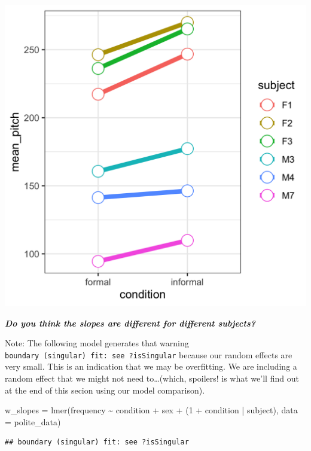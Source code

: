 \documentclass[
  openany]{book}
\newenvironment{Shaded}{\begin{snugshade}}{\end{snugshade}}
\newcommand{\AttributeTok}[1]{\textcolor[rgb]{0.77,0.63,0.00}{#1}}
\newcommand{\DecValTok}[1]{\textcolor[rgb]{0.00,0.00,0.81}{#1}}
\newcommand{\FunctionTok}[1]{\textcolor[rgb]{0.00,0.00,0.00}{#1}}
\newcommand{\NormalTok}[1]{#1}
\newcommand{\OtherTok}[1]{\textcolor[rgb]{0.56,0.35,0.01}{#1}}
\newcommand{\SpecialCharTok}[1]{\textcolor[rgb]{0.00,0.00,0.00}{#1}}
\begin{document}
\includegraphics[width=16.67in]{images/m3/subject_slopes}

\textbf{\emph{Do you think the slopes are different for different subjects?}}

Note: The following model generates that warning \texttt{boundary\ (singular)\ fit:\ see\ ?isSingular} because our random effects are very small. This is an indication that we may be overfitting. We are including a random effect that we might not need to\ldots(which, spoilers! is what we'll find out at the end of this secion using our model comparison).

\begin{Shaded}
\begin{Highlighting}[]
\NormalTok{w\_slopes }\OtherTok{=} \FunctionTok{lmer}\NormalTok{(frequency }\SpecialCharTok{\textasciitilde{}}\NormalTok{ condition }\SpecialCharTok{+}\NormalTok{ sex }\SpecialCharTok{+}\NormalTok{ (}\DecValTok{1} \SpecialCharTok{+}\NormalTok{ condition }\SpecialCharTok{|}\NormalTok{ subject),  }\AttributeTok{data =}\NormalTok{ polite\_data)}
\end{Highlighting}
\end{Shaded}

\begin{verbatim}
## boundary (singular) fit: see ?isSingular
\end{verbatim}
\end{document}
